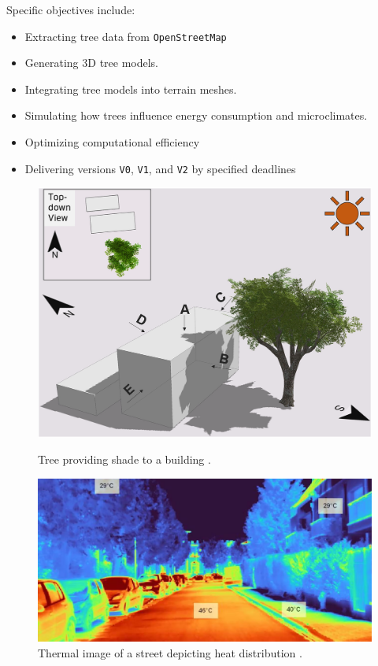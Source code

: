 \documentclass[12pt]{article}
\begin{document}
Specific objectives include:
\begin{itemize}
    \item Extracting tree data from \texttt{OpenStreetMap}
    \item Generating 3D tree models.
    \item Integrating tree models into terrain meshes.
    \item Simulating how trees influence energy consumption and microclimates.
    \item Optimizing computational efficiency
    \item Delivering versions \texttt{V0}, \texttt{V1}, and \texttt{V2} by specified deadlines
\end{itemize}

\begin{figure}[H]
    \centering
    \begin{minipage}{0.45\textwidth}
        \centering
        \includegraphics[width=\textwidth]{images/TreeShade.png}
        \caption{Tree providing shade to a building \cite{img:TreeShade}.}
    \end{minipage}\hfill
    \begin{minipage}{0.45\textwidth}
        \centering
        \includegraphics[width=\textwidth]{images/heat_street.png}
        \caption{Thermal image of a street depicting heat distribution \cite{img:street_thermography}.}
    \end{minipage}
\end{figure}
\end{document}
